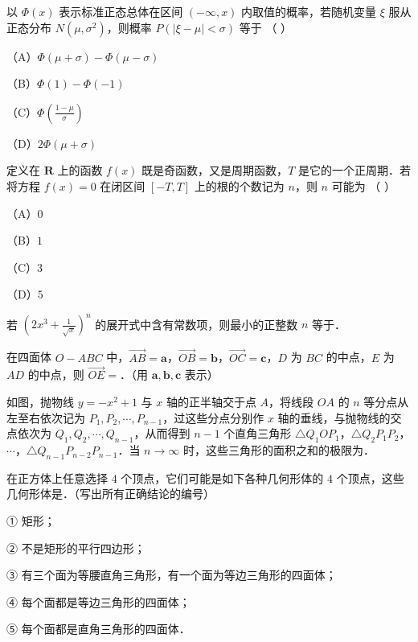 \begin{question}
以 $\Phi(x)$ 表示标准正态总体在区间 $(-\infty,x)$ 内取值的概率，若随机变量 $\xi$ 服从正态分布 $N(\mu,\sigma^2)$，则概率 $P(|\xi-\mu|<\sigma)$ 等于 （ ）

（A）$\Phi(\mu+\sigma)-\Phi(\mu-\sigma)$

（B）$\Phi(1)-\Phi(-1)$

（C）$\Phi\left(\frac{1-\mu}{\sigma}\right)$

（D）$2\Phi(\mu+\sigma)$

\end{question}
\begin{question}
定义在 $\mathbf R$ 上的函数 $f(x)$ 既是奇函数，又是周期函数，$T$ 是它的一个正周期．若将方程 $f(x)=0$ 在闭区间 $[-T,T]$ 上的根的个数记为 $n$，则 $n$ 可能为 （ ）

（A）$0$

（B）$1$

（C）$3$

（D）$5$

\end{question}

\begin{question}
若 $\left(2x^3+\frac{1}{\sqrt x}\right)^n$ 的展开式中含有常数项，则最小的正整数 $n$ 等于\gkblank{}．

\end{question}
\begin{question}
在四面体 $O-ABC$ 中，$\overrightarrow{AB}=\boldsymbol a$，$\overrightarrow{OB}=\boldsymbol b$，$\overrightarrow{OC}=\boldsymbol c$，$D$ 为 $BC$ 的中点，$E$ 为 $AD$ 的中点，则 $\overrightarrow{OE}=$\gkblank{}．（用 $\boldsymbol a,\boldsymbol b,\boldsymbol c$ 表示）

\Needspace{0.4\textheight}
\end{question}
\begin{question}
如图，抛物线 $y=-x^2+1$ 与 $x$ 轴的正半轴交于点 $A$，将线段 $OA$ 的 $n$ 等分点从左至右依次记为 $P_1,P_2,\cdots,P_{n-1}$，过这些分点分别作 $x$ 轴的垂线，与抛物线的交点依次为 $Q_1,Q_2,\cdots,Q_{n-1}$，从而得到 $n-1$ 个直角三角形 $\triangle Q_1OP_1$，$\triangle Q_2P_1P_2$，$\cdots$，$\triangle Q_{n-1}P_{n-2}P_{n-1}$．当 $n\to\infty$ 时，这些三角形的面积之和的极限为\gkblank{}．
\nopagebreak[4]
\begin{center}\end{center}
\nopagebreak[4]
\end{question}
\begin{question}
在正方体上任意选择 $4$ 个顶点，它们可能是如下各种几何形体的 $4$ 个顶点，这些几何形体是\gkblank{}．（写出所有正确结论的编号）

① 矩形；

② 不是矩形的平行四边形；

③ 有三个面为等腰直角三角形，有一个面为等边三角形的四面体；

④ 每个面都是等边三角形的四面体；

⑤ 每个面都是直角三角形的四面体．

\end{question}

